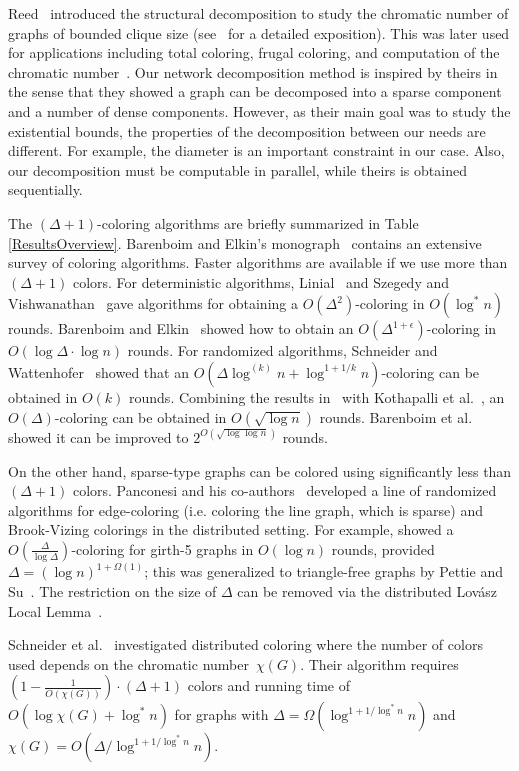 \documentclass[11pt]{amsart}
\begin{document}
Reed~\cite{ree98} introduced the structural decomposition to study the chromatic number of graphs of bounded clique size (see~\cite{MR01} for a detailed exposition). This was later used for applications including total coloring, frugal coloring, and computation of the chromatic number~\cite{ree99, mol14, mol98, mol10}. Our network decomposition method is inspired by theirs in the sense that they showed a graph can be decomposed into a sparse component and a number of dense components. However, as their main goal was to study the existential bounds, the properties of the decomposition between our needs are different. For example, the diameter is an important constraint in our case. Also, our decomposition must be computable in parallel, while theirs is obtained sequentially.

The $(\Delta + 1)$-coloring algorithms are briefly summarized in Table \ref{ResultsOverview}. Barenboim and Elkin's monograph~\cite{bar13} contains an extensive survey of coloring algorithms. Faster algorithms are available if we use more than $(\Delta+1)$ colors. For deterministic algorithms, Linial~\cite{linial92} and Szegedy and Vishwanathan~\cite{SV93} gave algorithms for obtaining a $O(\Delta^2)$-coloring in $O(\log^{*} n)$ rounds. Barenboim and Elkin~\cite{elk10} showed how to obtain an $O(\Delta^{1+\epsilon})$-coloring in $O(\log \Delta \cdot \log n)$ rounds. For randomized algorithms, Schneider and Wattenhofer~\cite{Sch10} showed that an $O(\Delta \log^{(k)}n + \log^{1+1/k} n )$-coloring can be obtained in $O(k)$ rounds. Combining the results in~\cite{Sch10} with Kothapalli et al.~\cite{KSOS06}, an $O(\Delta)$-coloring can be obtained in $O(\sqrt{\log n})$ rounds. Barenboim et al.~\cite{BEPS16} showed it can be improved to $2^{O(\sqrt{\log \log n})}$ rounds.

On the other hand, sparse-type graphs can be colored using significantly less than $(\Delta+1)$ colors. Panconesi and his co-authors~\cite{GP00, DGP98, GP97, PS97} developed a line of randomized algorithms for edge-coloring (i.e. coloring the line graph, which is sparse) and Brook-Vizing colorings in the distributed setting. For example, \cite{GP00} showed a $O( \frac{\Delta}{\log \Delta})$-coloring for girth-5 graphs in $O(\log n)$ rounds, provided $\Delta = (\log n)^{1 + \Omega(1)}$; this was generalized to triangle-free graphs by Pettie and Su~\cite{PS13}. The restriction on the size of $\Delta$ can be removed via the distributed Lov\'{a}sz Local Lemma~\cite{CPS17}.

Schneider et al.~\cite{sch13} investigated distributed coloring where the number of colors used depends on the chromatic number~$\chi(G)$. Their algorithm requires $(1-\frac{1}{O(\chi(G))})\cdot(\Delta+1)$ colors and running time of $O(\log \chi(G) + \log^* n)$ for graphs with $\Delta = \Omega(\log^{1+1/\log^* n} n)$ and $\chi(G) = O(\Delta/\log^{1+1/\log^* n} n)$.
\end{document}
